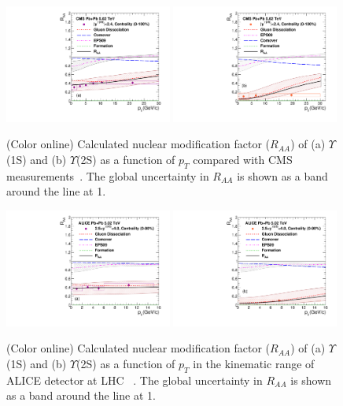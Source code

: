 {  

\begin{figure}
\includegraphics[width=0.49\textwidth]{Figures/Fig18l_Y1S_CMS_RAAPt_Shade.pdf}
\includegraphics[width=0.49\textwidth]{Figures/Fig18r_Y2S_CMS_RAAPt_Shade.pdf}
\caption{(Color online) Calculated nuclear modification factor ($R_{AA}$) \cite{Kumar:2019xdj}
  of (a) $\Upsilon$(1S) and 
  (b) $\Upsilon$(2S) as a function of $p_{T}$ 
  compared with CMS measurements~\cite{CMS:2018zza}.
The global uncertainty in $R_{AA}$ is shown as a band around the line at 1.
}
\label{fig:UpsilonRaaPtCMS}
\end{figure}



\begin{figure}
\includegraphics[width=0.49\textwidth]{Figures/Fig19l_ALICE_Y1SRAAPt_Shade.pdf}
\includegraphics[width=0.49\textwidth]{Figures/Fig19r_ALICE_Y2SRAAPt_Shade.pdf}
\caption{(Color online) Calculated nuclear modification factor ($R_{AA}$) \cite{Kumar:2019xdj}
  of (a) $\Upsilon$(1S) and 
  (b) $\Upsilon$(2S) as a function of $p_{T}$ in the kinematic range of ALICE detector
at LHC ~\cite{ALICE:2020wwx}. The global uncertainty in $R_{AA}$ is shown as a band
around the line at 1.
} 
\label{fig:UpsilonRaaPtALICE}
\end{figure}

}
